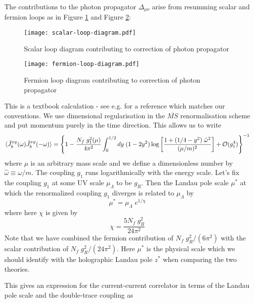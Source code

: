 \documentclass[aps,preprint,nofootinbib,preprintnumbers,eqsecnum,superscriptaddress]{revtex4}
\begin{document}
The contributions to the photon propagator $\Delta_{\mu \nu}$ arise from resumming scalar and fermion loops as in Figure \ref{scalar-loop-photon} and Figure \ref{fermion-loop-photon}:

\begin{figure}[!ht]
	\texttt{[image: scalar-loop-diagram.pdf]}
	\caption{Scalar loop diagram contributing to correction of photon propagator}
	\label{scalar-loop-photon}
\end{figure}

\begin{figure}[!ht]
	\texttt{[image: fermion-loop-diagram.pdf]}
	\caption{Fermion loop diagram contributing to correction of photon propagator}
	\label{fermion-loop-photon}
\end{figure}
This is a textbook calculation - see e.g. \cite{srednicki2007quantum} for a reference which matches our conventions. We use dimensional regularisation in the $\overline{MS}$ renormalisation scheme and put momentum purely in the time direction. This allows us to write
\begin{equation}
    \braket{\tilde{J}_b^{xy}(\omega)\tilde{J}_b^{xy}(-\omega)}
    =\left\{
    1-\frac{N_f \; g_1^2 (\mu)}{4\pi^2}\int_0^{1/2} dy\; (1-2y^2)\log\left[\frac{1 + (1/4-y^2) \; \hat{\omega}^2}{(\mu/m)^2}\right] + \mathcal{O}(g_1^4)
    \right\}^{-1}
\end{equation}
where $\mu$ is an arbitrary mass scale and we define a dimensionless number by $\hat{\omega} \equiv \omega/m$. The coupling $g_1$ runs logarithmically with the energy scale. Let's fix the coupling $g_1$ at some UV scale $\mu_\Lambda$ to be $g_R$. Then the Landau pole scale $\mu^*$ at which the renormalized coupling $g_1$ diverges is related to $\mu_\Lambda$ by
\begin{equation}
    \mu^* = \mu_\Lambda \; e^{1/\chi}
\end{equation}
where here $\chi$ is given by 
\begin{equation}
    \chi = \frac{5 N_f \; g_R^2}{24\pi^2}
\end{equation}
Note that we have combined the fermion contribution of $N_f \; g_R^2 / (6 \pi^2)$ with the scalar contribution of $N_f \; g_R^2 / (24 \pi^2)$. Here $\mu^{*}$ is the physical scale which we should identify with the holographic Landau pole $z^*$ when comparing the two theories.

This gives an expression for the current-current correlator in terms of the Landau pole scale and the double-trace coupling as 
\end{document}
